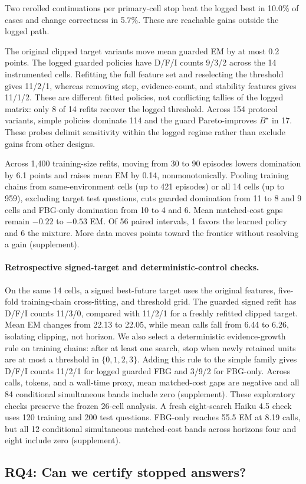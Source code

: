 Two rerolled continuations per primary-cell stop beat the logged best in 10.0\%
of cases and change correctness in 5.7\%. These are reachable gains outside the logged path.

The original clipped target variants move mean guarded EM by at most
0.2 points. The logged guarded policies have D/F/I counts 9/3/2 across the
14 instrumented cells. Refitting the full feature set and reselecting the
threshold gives 11/2/1, whereas removing step, evidence-count, and stability
features gives 11/1/2. These are different fitted policies, not conflicting
tallies of the logged matrix: only 8 of 14 refits recover the logged threshold.
Across 154 protocol variants, simple policies dominate 114 and the guard
Pareto-improves $B^\star$ in 17. These probes delimit sensitivity within the
logged regime rather than exclude gains from other designs.

Across 1{,}400 training-size refits, moving from 30 to 90 episodes lowers
domination by 6.1 points and raises mean EM by 0.14, nonmonotonically.
Pooling training chains from same-environment cells (up to 421 episodes) or
all 14 cells (up to 959), excluding target test questions, cuts guarded
domination from 11 to 8 and 9 cells and FBG-only domination from 10 to 4 and 6.
Mean matched-cost gaps remain $-0.22$ to $-0.53$ EM. Of 56 paired intervals,
1 favors the learned policy and 6 the mixture. More data moves points toward
the frontier without resolving a gain (supplement).

\paragraph{Retrospective signed-target and deterministic-control checks.}
On the same 14 cells, a signed best-future target uses the original features,
five-fold training-chain cross-fitting, and threshold grid. The guarded
signed refit has D/F/I counts 11/3/0, compared with 11/2/1 for a freshly
refitted clipped target. Mean EM changes from 22.13 to 22.05, while mean calls
fall from 6.44 to 6.26, isolating clipping, not horizon. We also select a deterministic evidence-growth rule on training chains:
after at least one search, stop when newly retained units are at most a
threshold in $\{0,1,2,3\}$. Adding this rule to the simple family gives
D/F/I counts 11/2/1 for logged guarded FBG and 3/9/2 for FBG-only.
Across calls, tokens, and a wall-time proxy, mean matched-cost gaps are
negative and all 84 conditional simultaneous bands include zero (supplement).
These exploratory checks preserve the frozen 26-cell analysis.
A fresh eight-search Haiku 4.5 check uses 120 training and 200 test questions.
FBG-only reaches 55.5 EM at 8.19 calls, but all 12 conditional simultaneous
matched-cost bands across horizons four and eight include zero (supplement).

\subsection{RQ4: Can we certify stopped answers?}


